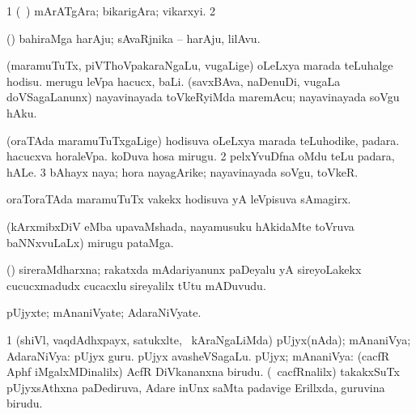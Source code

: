 \bentry
{} 
\gl{\nA}
\expl{}
\bmng
\bnum
\num{1} (\kanmu\ \nAyxshA) mArATgAra; bikarigAra; vikarxyi. 
\num{2}  
\enum
\emng
\eentry

\bentry
{} 
\gl{\nA}
\expl{}
\bmng
(\ame) bahiraMga harAju; sAvaRjnika -- harAju, lilAvu. 
\emng
\eentry

\bentry
{} 
\gl{\sakirx}
\expl{}
\bmng
\bnum
{} (maramuTuTx, piVThoVpakaraNgaLu, \mo vugaLige) 
\banum
{} oLeLxya marada teLuhalge hodisu. 
 merugu leVpa hacucx, baLi. (savxBAva, naDenuDi, \mo vugaLa doVSagaLanunx) nayavinayada toVkeRyiMda maremAcu; nayavinayada soVgu hAku. 
\eanum
\numie
\enum
\emng
\eentry

\bentry
{} 
\gl{\nA}
\expl{}
\bmng
\bnum
{} (oraTAda maramuTuTxgaLige) 
\banum
{} hodisuva oLeLxya marada teLuhodike, padara. 
 hacucxva horaleVpa. 
 koDuva hosa mirugu. 
\eanum
\numie
\num{2} pelxYvuDfna oMdu teLu padara, hALe. 
\num{3} bAhayx naya; hora nayagArike; nayavinayada soVgu, toVkeR. 
\enum
\emng
\eentry

\bentry
{} 
\gl{\nA}
\expl{}
\bmng
 oraToraTAda maramuTuTx \mo vakekx hodisuva yA leVpisuva sAmagirx. 
\emng
\eentry

\bentry
{} 
\gl{\nA}
\expl{}
\bmng
 (kArxmibxDiV eMba upavaMshada, nayamusuku hAkidaMte toVruva baNNxvuLaLx) mirugu pataMga. 
\emng
\eentry

\bentry
{} 
\gl{\nA}
\expl{}
\bmng
 (\veYshA) sireraMdharxna; rakatxda mAdariyanunx paDeyalu yA sireyoLakekx cucucxmadudx cucacxlu sireyalilx tUtu mADuvudu. 
\emng
\eentry

\bentry
{} 
\gl{\nA}
\expl{}
\bmng
 pUjyxte; mAnaniVyate; AdaraNiVyate. 
\emng
\eentry

\bentry
{} 
\gl{\gu}
\expl{}
\bmng
\bnum
\num{1} (shiVl, vaqdAdhxpayx, satukxlte, \mo\ kAraNgaLiMda) pUjyx(nAda); mAnaniVya; AdaraNiVya:  pUjyx guru.  pUjyx avasheVSagaLu. 
 pUjyx; mAnaniVya: 
\banum
{} (cacfR Aphf iMgalxMDinalilx) AcfR DiVkananxna birudu. 
 (\roVkAyx\ cacfRnalilx) takakxSuTx pUjyxsAthxna paDediruva, Adare inUnx saMta padavige Erillxda, guruvina birudu. 
\eanum
\numie
\enum
\emng
\eentry

